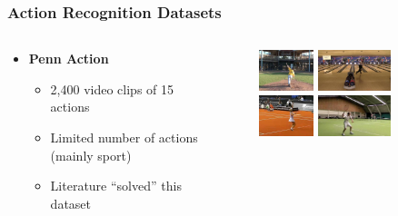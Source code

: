 \documentclass[9pt]{beamer}
\providecommand{\source}{\\ \footnotesize \tugreen{Source:} \footnotemark}
\newenvironment{myframe}[1][]{%
\begin{frame}%
\frametitle{#1}
\setcounter{footnote}{0}


}{%
\end{frame}%
}
\begin{document}
\begin{myframe}[Action Recognition Datasets]
  \begin{columns}[T]
      \begin{column}{.48\textwidth}
          \vspace{20px}
          \begin{itemize}
              \item \textbf{Penn Action\footnotemark}
              \begin{itemize}
                  \item 2,400 video clips of 15 actions
                  \item Limited number of actions (mainly sport)
                  \item Literature ``solved'' this dataset
              \end{itemize}
          \end{itemize}
      \end{column}
      \begin{column}{.48\textwidth}
          \begin{figure}
              \includegraphics[height=45px]{pa-01.jpg}
              \includegraphics[height=45px]{pa-02.jpg}
              \includegraphics[height=45px]{pa-03.jpg}
              \includegraphics[height=45px]{pa-04.jpg}
              \source
          \end{figure}
      \end{column}
  \end{columns}
\end{myframe}
\end{document}

